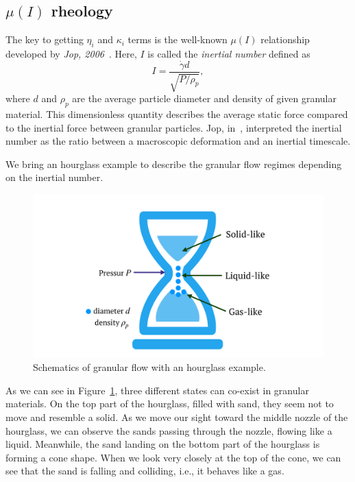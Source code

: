 \subsection{$\mu (I)$ rheology}
The key to getting $\eta_i$ and $\kappa_i$ terms is the well-known $\mu(I)$ relationship developed by \textit{Jop, 2006}~\cite{jop_constitutive_2006}.
Here, $I$ is called the \textit{inertial number} defined as 
\begin{equation}
  I =  \frac{\dot{\gamma} d }{\sqrt{P/\rho_p}},
  \label{eq_inertialI}
\end{equation}
where $d$ and $\rho_p$ are the average particle diameter and density of given granular material.
This dimensionless quantity describes the average static force compared to the inertial force between granular particles. Jop, in~\cite{jop_constitutive_2006}, interpreted the inertial number as the ratio between a macroscopic deformation and an inertial timescale. 
\par
We bring an hourglass example to describe the granular flow regimes depending on the inertial number. 
\begin{figure}[ht]
  \begin{center}
    \includegraphics[scale=0.15]{figures/fig_hourglass.pdf}
    \end{center}
  \caption{Schematics of granular flow with an hourglass example.}
  \label{fig_hourglass}
\end{figure}
As we can see in Figure~\ref{fig_hourglass}, three different states can co-exist in granular materials. 
On the top part of the hourglass, filled with sand, they seem not to move and resemble a solid. 
As we move our sight toward the middle nozzle of the hourglass, we can observe the sands passing through the nozzle, flowing like a liquid.
Meanwhile, the sand landing on the bottom part of the hourglass is forming a cone shape. When we look very closely at the top of the cone, we can see that the sand is falling and colliding, i.e., it behaves like a gas.
